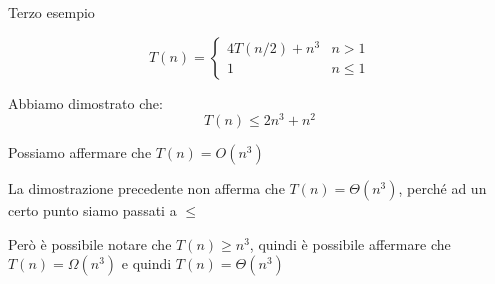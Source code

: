 \begin{frame}[noframenumbering,shrink=5]{Terzo esempio}

\vspace{-6pt}
\begin{mybox}
\[
T(n) = \begin{cases}
     4T(n/2) + n^3 & n > 1 \\
     1 & n \leq 1
  \end{cases} 
\]
\end{mybox}

Abbiamo dimostrato che:
\[
  T(n) \leq 2n^3 + n^2
\]

\bigskip
\BIL
\item Possiamo affermare che  $T(n) = O(n^3)$
\item La dimostrazione precedente non afferma che $T(n)=\Theta(n^3)$, perché ad un certo punto siamo passati a $\leq$
\item Però è possibile notare che $T(n) \geq n^3$, quindi è possibile affermare che
$T(n)=\Omega(n^3)$ e quindi $T(n)=\Theta(n^3)$
\EIL

\end{frame}

